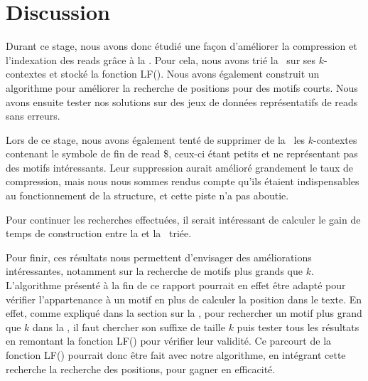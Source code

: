 \section*{Discussion}

Durant ce stage, nous avons donc étudié une façon d'améliorer la compression et l'indexation des reads grâce à la \kbwt. Pour cela, nous avons trié la \kbwt\ sur ses $k$-contextes et stocké la fonction LF(). Nous avons également construit un algorithme pour améliorer la recherche de positions pour des motifs courts. Nous avons ensuite tester nos solutions sur des jeux de données représentatifs de reads sans erreurs.

Lors de ce stage, nous avons également tenté de supprimer de la \kbwt\ les $k$-contextes contenant le symbole de fin de read \$, ceux-ci étant petits et ne représentant pas des motifs intéressants. Leur suppression aurait amélioré grandement le taux de compression, mais nous nous sommes rendus compte qu'ils étaient indispensables au fonctionnement de la structure, et cette piste n'a pas aboutie.

Pour continuer les recherches effectuées, il serait intéressant de calculer le gain de temps de construction entre la \bwt et la \kbwt\ triée.

Pour finir, ces résultats nous permettent d'envisager des améliorations intéressantes, notamment sur la recherche de motifs plus grands que $k$. L'algorithme présenté à la fin de ce rapport pourrait en effet être adapté pour vérifier l'appartenance à un motif en plus de calculer la position dans le texte. En effet, comme expliqué dans la section sur la \kbwt, pour rechercher un motif plus grand que $k$ dans la \kbwt, il faut chercher son suffixe de taille $k$ puis tester tous les résultats en remontant la fonction LF() pour vérifier leur validité. Ce parcourt de la fonction LF() pourrait donc être fait avec notre algorithme, en intégrant cette recherche la recherche des positions, pour gagner en efficacité.

